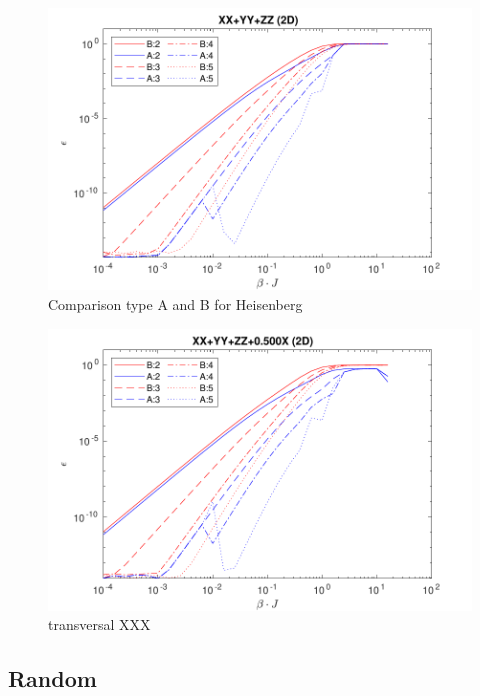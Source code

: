 \begin{figure}[H]
    \center
    \includegraphics[width=\textwidth]{Figuren/benchmarking/heisXXX.pdf}
    \caption{Comparison type A and B for Heisenberg}
    \label{fig:benchmark:Heisenberg}
\end{figure}



\begin{figure}[H]
    \center
    \includegraphics[width=\textwidth]{Figuren/benchmarking/t_heis_XXX.pdf}
    \caption{transversal XXX}
    \label{fig:benchmark:tHeisenberg}
\end{figure}



\subsection{Random}

